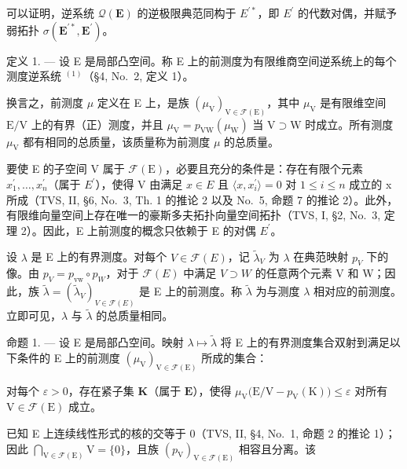 可以证明，逆系统 \(\mathcal{Q}(\mathbf{E})\) 的逆极限典范同构于 \(E^{\prime*}\)，即 \(E^{\prime}\) 的代数对偶，并赋予弱拓扑 \(\sigma(\mathbf{E}^{\prime*},\mathbf{E}^{\prime})\)。

定义 1. --- 设 E 是局部凸空间。称 E 上的前测度为有限维商空间逆系统上的每个测度逆系统 \(^{(1)}\)（§4, No.~2, 定义 1）。

换言之，前测度 \(\mu\) 定义在 E 上，是族 \((\mu_{\mathrm{V}})_{\mathrm{V}\in \mathcal{F}(\mathrm{E})}\)，其中 \(\mu_{\mathrm{V}}\) 是有限维空间 \(\mathrm{E / V}\) 上的有界（正）测度，并且 \(\mu_{\mathrm{V}} = p_{\mathrm{VW}}(\mu_{\mathrm{W}})\) 当 \(\mathrm{V}\supset \mathrm{W}\) 时成立。所有测度 \(\mu_{\mathrm{V}}\) 都有相同的总质量，该质量称为前测度 \(\mu\) 的总质量。

要使 E 的子空间 V 属于 \(\mathcal{F}(\mathrm{E})\)，必要且充分的条件是：存在有限个元素 \(x_{1}^{\prime},\ldots,x_{n}^{\prime}\)（属于 \(E^{\prime}\)），使得 V 由满足 \(x\in E\) 且 \(\langle x,x_{i}^{\prime}\rangle=0\) 对 \(1\leqslant i\leqslant n\) 成立的 x 所成（TVS, II, §6, No.~3, Th. 1 的推论 2 以及 No.~5, 命题 7 的推论 2）。此外，有限维向量空间上存在唯一的豪斯多夫拓扑向量空间拓扑（TVS, I, §2, No.~3, 定理 2）。因此，E 上前测度的概念只依赖于 E 的对偶 \(E^{\prime}\)。

设 \(\lambda\) 是 E 上的有界测度。对每个 \(V \in \mathcal{F}(E)\)，记 \(\widetilde{\lambda}_{V}\) 为 \(\lambda\) 在典范映射 \(p_{V}\) 下的像。由 \(p_{V} = p_{\mathrm{vw}} \circ p_{W}\)，对于 \(\mathcal{F}(E)\) 中满足 \(V \supset W\) 的任意两个元素 V 和 W；因此，族 \(\widetilde{\lambda} = (\widetilde{\lambda}_{V})_{V \in \mathcal{F}(E)}\) 是 E 上的前测度。称 \(\widetilde{\lambda}\) 为与测度 \(\lambda\) 相对应的前测度。立即可见，\(\lambda\) 与 \(\widetilde{\lambda}\) 的总质量相同。

命题 1. --- 设 E 是局部凸空间。映射 \(\lambda \mapsto \widetilde{\lambda}\) 将 E 上的有界测度集合双射到满足以下条件的 E 上的前测度 \((\mu_{\mathrm{V}})_{\mathrm{V} \in \mathcal{F}(\mathrm{E})}\) 所成的集合：

对每个 \(\varepsilon > 0\)，存在紧子集 \(\mathbf{K}\)（属于 \(\mathbf{E}\)），使得 \(\mu_{\mathrm{V}}\big(\mathrm{E} / \mathrm{V} - p_{\mathrm{V}}(\mathrm{K})\big) \leqslant \varepsilon\) 对所有 \(\mathrm{V} \in \mathcal{F}(\mathrm{E})\) 成立。

已知 E 上连续线性形式的核的交等于 0（TVS, II, §4, No.~1, 命题 2 的推论 1）；因此 \(\bigcap_{\mathrm{V} \in \mathcal{F}(\mathrm{E})} \mathrm{V} = \{0\}\)，且族 \((p_{\mathrm{V}})_{\mathrm{V} \in \mathcal{F}(\mathrm{E})}\) 相容且分离。该

